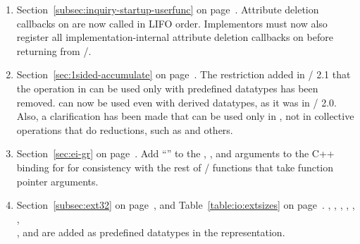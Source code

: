 \begin{enumerate}
\item
Section~\ref{subsec:inquiry-startup-userfunc} on page~\pageref{subsec:inquiry-startup-userfunc}. %
\newline
Attribute deletion callbacks on  are now called in LIFO order. Implementors must now also register all implementation-internal attribute deletion callbacks on  before returning from /.

\item
Section~\ref{sec:1sided-accumulate} on page~\pageref{sec:1sided-accumulate}. %
\newline
The restriction added in \MPI/ 2.1 that the operation  in  can be used only with predefined datatypes has been removed.  can now be used even with derived datatypes, as it was in \MPI/ 2.0. Also, a clarification has been made that  can be used only in , not in collective operations that do reductions, such as  and others.

\item
{}%
Section~\ref{sec:ei-gr} on page~\pageref{sec:ei-gr}. %
\newline
Add ``\code{*}'' to the , , and  arguments to the C++ binding for  for consistency with the rest of \MPI/ functions that take function pointer arguments. 

\item
{\raggedright
{}%
%
Section~\ref{subsec:ext32} on page~\pageref{subsec:ext32}, and  %
Table~\ref{table:io:extsizes} on page~\pageref{table:io:extsizes}. %
\newline
{}, , , , , ,\\, and  are added as predefined datatypes in the
 representation.

}
\end{enumerate}
